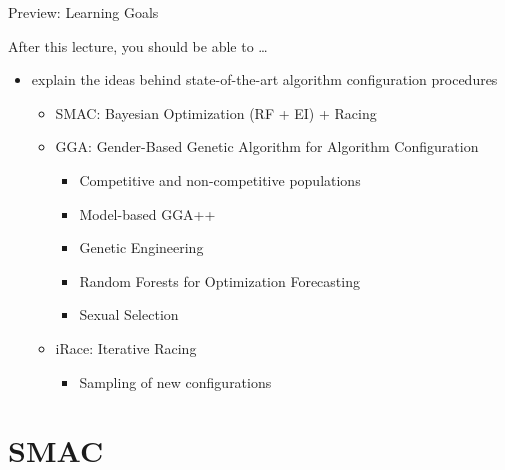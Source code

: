 \begin{frame}[c]{Preview: Learning Goals}

After this lecture, you should be able to \ldots
\begin{itemize}
  \item explain the ideas behind state-of-the-art algorithm configuration procedures
  \begin{itemize}
    \item SMAC: Bayesian Optimization (RF + EI) + Racing
    \item GGA: Gender-Based Genetic Algorithm for Algorithm Configuration
	\begin{itemize}
	  \item Competitive and non-competitive populations
	  \item Model-based GGA++
	  \item Genetic Engineering
	  \item Random Forests for Optimization Forecasting
	  \item Sexual Selection
	\end{itemize}
	\item iRace: Iterative Racing
    \begin{itemize}
      \item Sampling of new configurations
    \end{itemize}
  \end{itemize}  

\end{itemize}

\end{frame}

\section{SMAC}

